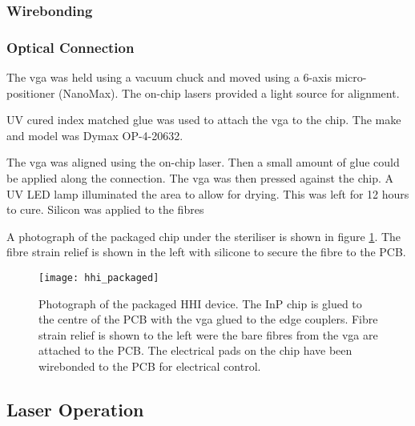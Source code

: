 
\subsubsection*{Wirebonding}



\subsubsection*{Optical Connection}

The \ac{vga} was held using a vacuum chuck and moved using a 6-axis micro-positioner (NanoMax). The on-chip lasers provided a light source for alignment. 

UV cured index matched glue was used to attach the \ac{vga} to the chip. The make and model was Dymax OP-4-20632.

The \ac{vga} was aligned using the on-chip laser. Then a small amount of glue could be applied along the connection. The \ac{vga} was then pressed against the chip. A UV LED lamp illuminated the area to allow for drying. This was left for 12 hours to cure. Silicon was applied to the fibres 

A photograph of the packaged chip under the steriliser is shown in figure \ref{fig:hhi_photo}. The fibre strain relief is shown in the left with silicone to secure the fibre to the PCB. 

\begin{figure}
	\centering
	\texttt{[image: hhi\_packaged]}
	\caption[Photograph of packaged HHI transmitter]{Photograph of the packaged HHI device. The \ac{InP} chip is glued to the centre of the PCB with the \ac{vga} glued to the edge couplers. Fibre strain relief is shown to the left were the bare fibres from the \ac{vga} are attached to the PCB. The electrical pads on the chip have been wirebonded to the PCB for electrical control.}
	\label{fig:hhi_photo}
\end{figure}

\subsection{Laser Operation}

